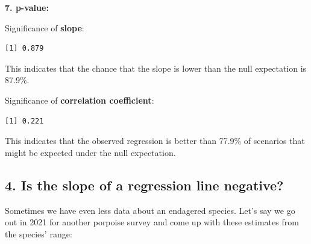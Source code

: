 \documentclass[
]{book}
\newenvironment{Shaded}{\begin{snugshade}}{\end{snugshade}}
\newcommand{\DecValTok}[1]{\textcolor[rgb]{0.00,0.00,0.81}{#1}}
\newcommand{\KeywordTok}[1]{\textcolor[rgb]{0.13,0.29,0.53}{\textbf{#1}}}
\newcommand{\NormalTok}[1]{#1}
\newcommand{\OperatorTok}[1]{\textcolor[rgb]{0.81,0.36,0.00}{\textbf{#1}}}
\newcommand{\StringTok}[1]{\textcolor[rgb]{0.31,0.60,0.02}{#1}}
\begin{document}
\textbf{7. p-value:}

Significance of \textbf{slope}:

\begin{Shaded}
\end{Shaded}

\begin{verbatim}
[1] 0.879
\end{verbatim}

This indicates that the chance that the slope is lower than the null expectation is 87.9\%.

Significance of \textbf{correlation coefficient}:

\begin{Shaded}
\end{Shaded}

\begin{verbatim}
[1] 0.221
\end{verbatim}

This indicates that the observed regression is better than 77.9\% of scenarios that might be expected under the null expectation.

\hypertarget{is-the-slope-of-a-regression-line-negative}{%
\subsection*{4. Is the slope of a regression line negative?}\label{is-the-slope-of-a-regression-line-negative}}

Sometimes we have even less data about an endagered species. Let's say we go out in 2021 for another porpoise survey and come up with these estimates from the species' range:
\end{document}
